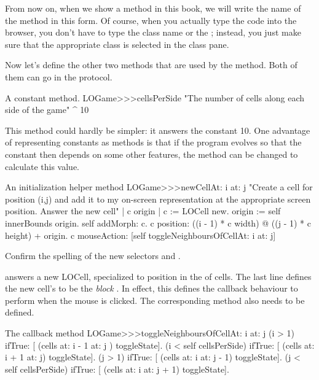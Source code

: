 \documentclass[a4paper,10pt,twoside]{book}
\begin{document}
From now on, when we show a method in this book, we will write the name of the method in this form.  Of course, when you actually type the code into the browser, you don't have to type the class name or the \ct{>>>}; instead, you just make sure that the appropriate class is selected in the class pane.  

Now let's define the other two methods that are used by the  method. Both of them can go in the  protocol.

\begin{method}[sbegamecellsperside]{A constant method.}
LOGame>>>cellsPerSide
   "The number of cells along each side of the game"
   ^ 10
\end{method}

This method could hardly be simpler: it answers the constant 10.  One advantage of representing constants as methods is that if the program evolves so that the constant then depends on some other features, the method can be changed to calculate this value.

\begin{method}[newCellAt:at:]{An initialization helper method}
LOGame>>>newCellAt: i at: j
   "Create a cell for position (i,j) and add it to my on-screen
   representation at the appropriate screen position.  Answer the new cell"
   | c origin |
   c := LOCell new.
   origin := self innerBounds origin.
   self addMorph: c.
   c position: ((i - 1) * c width) @ ((j - 1) * c height) + origin.
   c mouseAction: [self toggleNeighboursOfCellAt: i at: j]
\end{method}

Confirm the spelling of the new selectors  and .

 answers a new LOCell, specialized to position  in the  of cells.
The last line defines the new cell's  to be the \emph{block}
\mbox{.}
 In effect, this defines the callback behaviour to perform when the mouse is clicked.
The corresponding method also needs to be defined.

\begin{method}[toggleNeighboursOfCellAt:at:]{The callback method}
LOGame>>>toggleNeighboursOfCellAt: i at: j
   (i > 1) ifTrue: [ (cells at: i - 1 at: j ) toggleState].
   (i < self cellsPerSide) ifTrue: [ (cells at: i + 1 at: j) toggleState].
   (j > 1) ifTrue: [ (cells at: i  at: j - 1) toggleState].
   (j < self cellsPerSide) ifTrue: [ (cells at: i at: j + 1) toggleState].
\end{method}
\end{document}
